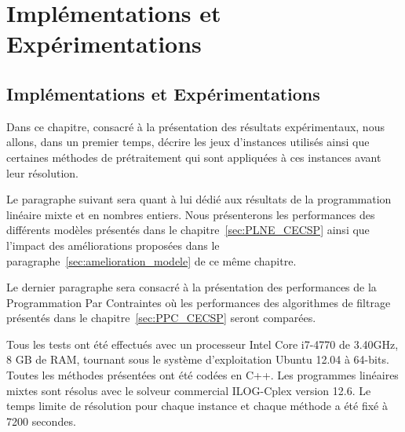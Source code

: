 \part{Implémentations et Expérimentations}

\chapter{Implémentations et Expérimentations}

Dans ce chapitre, consacré à la présentation des résultats
expérimentaux, nous allons, dans un premier temps, décrire les
jeux d'instances utilisés ainsi que certaines méthodes de
prétraitement qui sont appliquées à ces instances avant leur
résolution. 

Le paragraphe suivant sera quant à lui dédié aux résultats de la
programmation linéaire mixte et en nombres entiers. Nous présenterons
les performances des différents modèles présentés dans le
chapitre~\ref{sec:PLNE_CECSP} ainsi que l'impact des améliorations
proposées dans le paragraphe~\ref{sec:amelioration_modele} de ce même
chapitre. 

Le dernier paragraphe sera consacré à la présentation des performances
de la Programmation Par Contraintes où les performances des
algorithmes de filtrage présentés dans le chapitre~\ref{sec:PPC_CECSP}
seront comparées. 

Tous les tests ont été effectués avec un processeur Intel Core i7-4770
de 3.40GHz, 8 GB de RAM, tournant sous le système d’exploitation
Ubuntu 12.04 à 64-bits. Toutes les méthodes présentées ont été codées
en C++. Les programmes linéaires mixtes sont résolus avec le solveur
commercial ILOG-Cplex version 12.6. Le temps limite de résolution pour
chaque instance et chaque méthode a été fixé à 7200 secondes.
\label{sec:expe}









